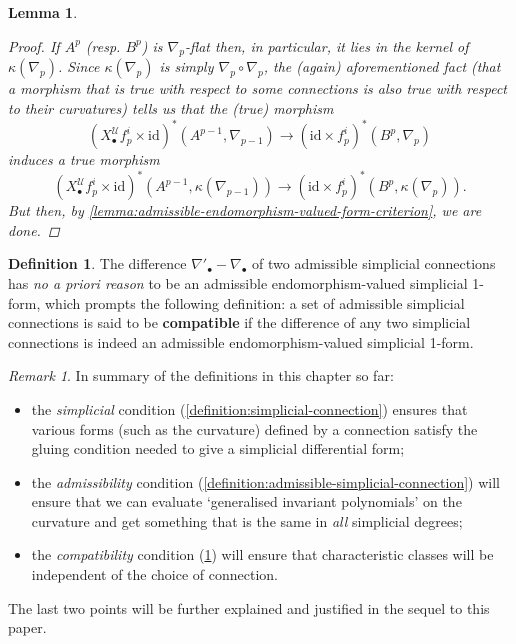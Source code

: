 \documentclass[11pt,fleqn]{article}
\theoremstyle{plain}
\newtheorem{lemma}[theorem]{Lemma}
\theoremstyle{definition}
\newtheorem{definition}[theorem]{Definition}
\theoremstyle{remark}
\newtheorem{remark}[theorem]{Remark}
\numberwithin{equation}{theorem}
\newcommand{\cover}{\mathcal{U}}
\newcommand{\id}{\mathrm{id}}
\newcommand{\define}[1]{\textbf{#1}}
\newcommand{\nerve}[1]{X_{#1}^\cover}
\begin{document}
\begin{lemma}
            \begin{proof}
                If $A^p$ (resp. $B^p$) is $\nabla_p$-flat then, in particular, it lies in the kernel of $\kappa(\nabla_p)$.
                Since $\kappa(\nabla_p)$ is simply $\nabla_p\circ\nabla_p$, the (again) aforementioned fact (that a morphism that is true with respect to some connections is also true with respect to their curvatures) tells us that the (true) morphism
                \begin{equation*}
                    (\nerve{\bullet} f_p^i\times\id)^*\left(A^{p-1},\nabla_{p-1}\right)\to(\id\times f_p^i)^*\left(B^p,\nabla_p\right)
                \end{equation*}
                induces a \emph{true} morphism
                \begin{equation*}
                    (\nerve{\bullet} f_p^i\times\id)^*\left(A^{p-1},\kappa(\nabla_{p-1})\right)\to(\id\times f_p^i)^*\left(B^p,\kappa(\nabla_p)\right).
                \end{equation*}
                But then, by \cref{lemma:admissible-endomorphism-valued-form-criterion}, we are done.
            \end{proof}
        \end{lemma}
        
        \begin{definition}\label{definition:compatible-family-of-simplicial-connections}
            The difference $\nabla'_\bullet-\nabla_\bullet$ of two admissible simplicial connections has \emph{no a priori reason} to be an admissible endomorphism-valued simplicial 1-form, which prompts the following definition: a set of admissible simplicial connections is said to be \define{compatible} if the difference of any two simplicial connections is indeed an admissible endomorphism-valued simplicial 1-form.
        \end{definition}
        
        \begin{remark}
            In summary of the definitions in this chapter so far:
            \begin{itemize}
                \item the \emph{simplicial} condition (\cref{definition:simplicial-connection}) ensures that various forms (such as the curvature) defined by a connection satisfy the gluing condition needed to give a simplicial differential form;
                \item the \emph{admissibility} condition (\cref{definition:admissible-simplicial-connection}) will ensure that we can evaluate `generalised invariant polynomials' on the curvature and get something that is the same in \emph{all} simplicial degrees;
                \item the \emph{compatibility} condition (\cref{definition:compatible-family-of-simplicial-connections}) will ensure that characteristic classes will be independent of the choice of connection.
            \end{itemize}
            The last two points will be further explained and justified in the sequel to this paper.
        \end{remark}
\end{document}

